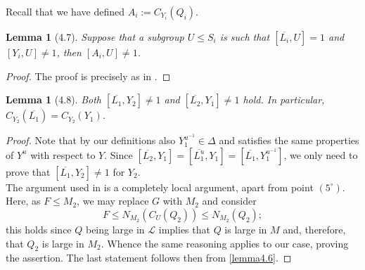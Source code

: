 \documentclass{amsart}
\numberwithin{equation}{section}
\newtheorem{lemma}[equation]{Lemma}
\theoremstyle{definition}
\theoremstyle{subresult}
\theoremstyle{caseresult}
\renewcommand{\L}{\mathcal{L}}
\newcommand{\ov}{\overline}
\newcommand{\inv}{^{-1}}
\newcommand{\<}{\langle}
\renewcommand{\>}{\rangle}
\begin{document}
Recall that we have defined $A_i:= C_{Y_i}(Q_i)$.
\begin{lemma}[4.7]\label{lemma4.7}
	Suppose that a subgroup $U \le S_i$ is such that $[\ov{L_i},U]=1$ and $[Y_i,U] \ne 1$, then $[A_i,U] \ne 1$.
\end{lemma}
\begin{proof}
	The proof is precisely as in \cite[Lemma 4.7]{Meier-Stell-Stroth:2012}.	
\end{proof}

\begin{lemma}[4.8]\label{lemma4.8}
	Both $[\ov{L_1},Y_2] \ne 1$ and $[\ov{L_2},Y_1] \ne 1$ hold. In particular, $C_{Y_2}(\ov{L_1}) = C_{Y_2}(Y_1)$.
\end{lemma}
\begin{proof} 
	Note that by our definitions also $Y_1^{u\inv} \in \Delta$ and satisfies the same properties of $Y^u$ with respect to $Y$. Since $[\ov{L_2}, Y_1] = [\ov{L_1^{u}}, Y_1] = [\ov{L_1}, Y_1^{u\inv}]$, we only need to prove that $[\ov{L_1},Y_2] \ne 1$ for $Y_2$.\\
	The argument used in \cite[Lemma 4.8]{Meier-Stell-Stroth:2012} is a completely local argument, apart from point $(5^\circ)$. Here, as $F \le M_2$, we may replace $G$ with $M_2$ and consider
	\[
	F \le N_{M_2}(C_U(Q_2)) \le N_{M_2}(Q_2);
	\]
	this holds since $Q$ being large in $\L$ implies that $Q$ is large in $M$ and, therefore, that $Q_2$ is large in $M_2$.	Whence the same reasoning applies to our case, proving the assertion. The last statement follows then from \eqref{lemma4.6}.
\end{proof}
\end{document}
